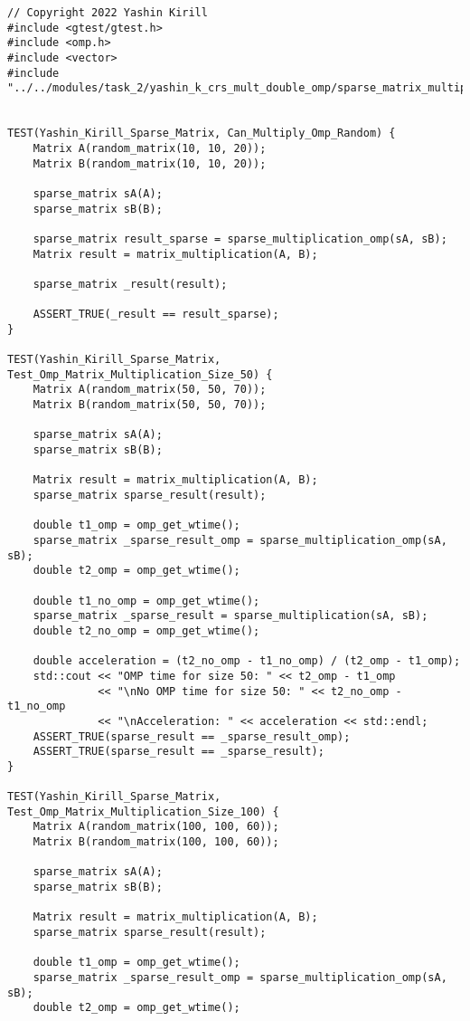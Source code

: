 \documentclass{report}
\begin{document}
\begin{lstlisting}
// Copyright 2022 Yashin Kirill
#include <gtest/gtest.h>
#include <omp.h>
#include <vector>
#include "../../modules/task_2/yashin_k_crs_mult_double_omp/sparse_matrix_multiplication_omp.h"


TEST(Yashin_Kirill_Sparse_Matrix, Can_Multiply_Omp_Random) {
    Matrix A(random_matrix(10, 10, 20));
    Matrix B(random_matrix(10, 10, 20));

    sparse_matrix sA(A);
    sparse_matrix sB(B);

    sparse_matrix result_sparse = sparse_multiplication_omp(sA, sB);
    Matrix result = matrix_multiplication(A, B);

    sparse_matrix _result(result);

    ASSERT_TRUE(_result == result_sparse);
}

TEST(Yashin_Kirill_Sparse_Matrix, Test_Omp_Matrix_Multiplication_Size_50) {
    Matrix A(random_matrix(50, 50, 70));
    Matrix B(random_matrix(50, 50, 70));

    sparse_matrix sA(A);
    sparse_matrix sB(B);

    Matrix result = matrix_multiplication(A, B);
    sparse_matrix sparse_result(result);

    double t1_omp = omp_get_wtime();
    sparse_matrix _sparse_result_omp = sparse_multiplication_omp(sA, sB);
    double t2_omp = omp_get_wtime();

    double t1_no_omp = omp_get_wtime();
    sparse_matrix _sparse_result = sparse_multiplication(sA, sB);
    double t2_no_omp = omp_get_wtime();

    double acceleration = (t2_no_omp - t1_no_omp) / (t2_omp - t1_omp);
    std::cout << "OMP time for size 50: " << t2_omp - t1_omp
              << "\nNo OMP time for size 50: " << t2_no_omp - t1_no_omp
              << "\nAcceleration: " << acceleration << std::endl;
    ASSERT_TRUE(sparse_result == _sparse_result_omp);
    ASSERT_TRUE(sparse_result == _sparse_result);
}

TEST(Yashin_Kirill_Sparse_Matrix, Test_Omp_Matrix_Multiplication_Size_100) {
    Matrix A(random_matrix(100, 100, 60));
    Matrix B(random_matrix(100, 100, 60));

    sparse_matrix sA(A);
    sparse_matrix sB(B);

    Matrix result = matrix_multiplication(A, B);
    sparse_matrix sparse_result(result);

    double t1_omp = omp_get_wtime();
    sparse_matrix _sparse_result_omp = sparse_multiplication_omp(sA, sB);
    double t2_omp = omp_get_wtime();


\end{lstlisting}
\end{document}
